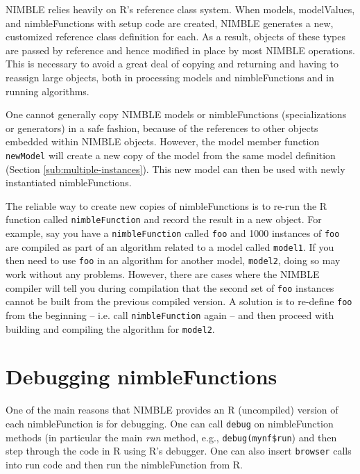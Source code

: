 \documentclass[12pt,oneside]{book}\usepackage[]{graphicx}\usepackage[]{color}
\def\cd#1{\texttt{#1}}
\def\nm#1{\textit{#1}}
\begin{document}
{
NIMBLE relies heavily on R's reference class system.  When models,
modelValues, and nimbleFunctions with setup code are created, NIMBLE
generates a new, customized reference class definition for each.  As a
result, objects of these types are passed by reference and hence
modified in place by most NIMBLE operations. This is necessary to
avoid a great deal of copying and returning and having to reassign
large objects, both in processing models and nimbleFunctions  and in
running algorithms.

One cannot generally copy NIMBLE models or nimbleFunctions
(specializations or generators) in a safe fashion, because of the
references to other objects embedded within NIMBLE objects. However,
the model member function \cd{newModel} will create a new copy of
the model from the same model definition
(Section \ref{sub:multiple-instances}). This new model can then be used with
newly instantiated nimbleFunctions.


The reliable way to create new copies of nimbleFunctions is to re-run
the R function called \cd{nimbleFunction} and record the result in a
new object.  For example, say you have a \cd{nimbleFunction} called
\cd{foo} and 1000 instances of \cd{foo} are compiled as part of an
algorithm related to a model called \cd{model1}.  If you then need to use \cd{foo} in
an algorithm for another model, \cd{model2}, doing so may work without
any problems.  However, there are cases where the NIMBLE compiler will
tell you during compilation that the second set of \cd{foo} instances
cannot be built from the previous compiled version.  A solution is to
re-define \cd{foo} from the beginning -- i.e. call \cd{nimbleFunction}
again -- and then proceed with building and compiling the algorithm
for \cd{model2}.  

\section{Debugging nimbleFunctions}
\label{sec:debugging}

One of the main reasons that NIMBLE provides an R (uncompiled) version
of each nimbleFunction is for debugging. One can call \cd{debug} on
nimbleFunction methods (in particular the main \nm{run} method, e.g., \cd{debug(mynf\$run}) and
then step through the code in R using R's debugger. One can also
insert \cd{browser} calls into run code and then run the
nimbleFunction from R. 

}
\end{document}
